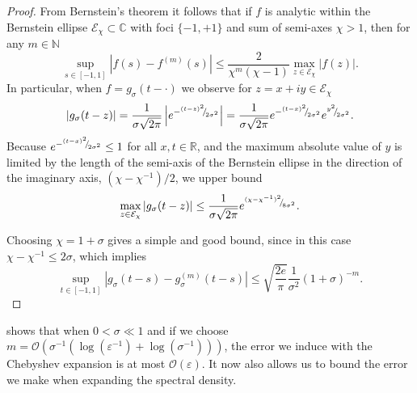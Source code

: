 \begin{proof}
    From Bernstein's theorem \cite[theorem 4.3]{trefethen-2008-gauss-quadrature} it follows that if $f$ is analytic within the Bernstein ellipse $\mathcal{E}_{\chi} \subset \mathbb{C}$ with foci $\{-1, +1\}$ and sum of semi-axes $\chi > 1$, then for any $m \in \mathbb{N}$
    \begin{equation}
        \sup_{s \in [-1, 1]} \left| f(s) - f^{(m)}(s) \right| \leq \frac{2}{\chi^m (\chi - 1)} \max_{z \in \mathcal{E}_{\chi}} |f(z)|.
        \label{equ:bernstein-bound}
    \end{equation}
    In particular, when $f = g_{\sigma}(t - \cdot)$ we observe for $z = x + iy \in \mathcal{E}_{\chi}$
    \begin{equation}
    | g_{\sigma}(t - z) | 
    = \frac{1}{\sigma \sqrt{2 \pi}} \left| e^{-{}^{(t - z)^2}{\mskip -5mu/\mskip -3mu}_{2\sigma^2}} \right|
    = \frac{1}{\sigma \sqrt{2 \pi}} e^{-{}^{(t - x)^2}{\mskip -5mu/\mskip -3mu}_{2\sigma^2}}e^{{}^{y^2}{\mskip -5mu/\mskip -3mu}_{2\sigma^2}}.
    \end{equation}
    Because $e^{-{}^{(t - x)^2}{\mskip -5mu/\mskip -3mu}_{2\sigma^2}} \leq 1$ for all $x, t \in \mathbb{R}$, and the maximum absolute value of $y$ is limited by the length of the semi-axis of the Bernstein ellipse in the direction of the imaginary axis, $(\chi - \chi^{-1}) / 2$, we upper bound
    \begin{equation}
        \max_{z \in \mathcal{E}_{\chi}} | g_{\sigma}(t - z) | 
        \leq \frac{1}{\sigma \sqrt{2 \pi}} e^{{}^{(\chi - \chi^{-1})^2}{\mskip -5mu/\mskip -3mu}_{8 \sigma^2}}.
    \end{equation}

    Choosing $\chi = 1 + \sigma$ gives a simple and good bound, since in this case $\chi - \chi^{-1} \leq 2\sigma$, which implies
    \begin{equation}
        \sup_{t \in [-1, 1]} \left| g_{\sigma}(t - s) - g_{\sigma}^{(m)}(t - s) \right| \leq \sqrt{\frac{2e}{\pi}} \frac{1}{\sigma^2} (1 + \sigma)^{-m}.
    \end{equation}
\end{proof}

 shows that when $0 < \sigma \ll 1$ and if we choose $m = \mathcal{O}(\sigma^{-1}(\log(\varepsilon^{-1}) + \log(\sigma^{-1})))$, the error we induce with the Chebyshev expansion is at most $\mathcal{O}(\varepsilon)$. It now also allows us to bound the error we make when expanding the spectral density.


